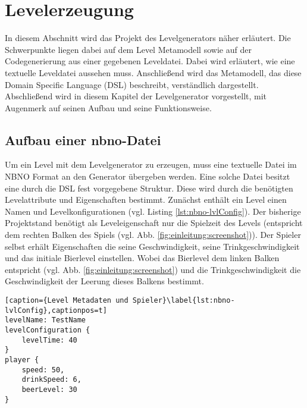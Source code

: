 \section{Levelerzeugung}\label{sec:levelerzeugung}

In diesem Abschnitt wird das Projekt des Levelgenerators näher erläutert. Die Schwerpunkte liegen dabei auf dem Level Metamodell sowie auf der Codegenerierung aus einer gegebenen Leveldatei. \newline 
Dabei wird erläutert, wie eine textuelle Leveldatei aussehen muss. Anschließend wird das Metamodell, das diese  Domain Specific Language (DSL) beschreibt, verständlich dargestellt.\newline
Abschließend wird in diesem Kapitel der Levelgenerator vorgestellt, mit Augenmerk auf seinen Aufbau und seine Funktionsweise.

\subsection{Aufbau einer nbno-Datei}
Um ein Level mit dem Levelgenerator zu erzeugen, muss eine textuelle Datei im NBNO Format an den Generator übergeben werden. Eine solche Datei besitzt eine durch die DSL fest vorgegebene Struktur. Diese wird durch die benötigten Levelattribute und Eigenschaften bestimmt.\newline
Zunächst enthält ein Level einen Namen und Levelkonfigurationen (vgl. Listing \ref{lst:nbno-lvlConfig}). Der bisherige Projektstand benötigt als Leveleigenschaft nur die Spielzeit des Levels (entspricht dem rechten Balken des Spiels (vgl. Abb. \ref{fig:einleitung:screenshot})).\newline
Der Spieler selbst erhält Eigenschaften die seine Geschwindigkeit, seine Trinkgeschwindigkeit und das initiale Bierlevel einstellen. Wobei das Bierlevel dem linken Balken entspricht (vgl. Abb. \ref{fig:einleitung:screenshot}) und die Trinkgeschwindigkeit die Geschwindigkeit der Leerung dieses Balkens bestimmt.

\begin{lstlisting}[caption={Level Metadaten und Spieler}\label{lst:nbno-lvlConfig},captionpos=t]
levelName: TestName
levelConfiguration {
    levelTime: 40
}
player {
    speed: 50,
    drinkSpeed: 6,
    beerLevel: 30
}
\end{lstlisting}

